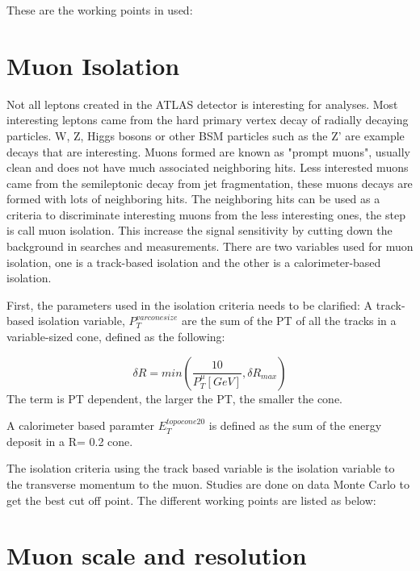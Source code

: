 These are the working points in used: 



\section{Muon Isolation}
Not all leptons created in the ATLAS detector is interesting for analyses. Most interesting leptons came from the hard primary vertex decay of radially decaying particles. W, Z, Higgs bosons or other BSM particles such as the Z' are example decays that are interesting. Muons formed are known as "prompt muons", usually clean and does not have much associated neighboring hits. Less interested muons came from the semileptonic decay from jet fragmentation, these muons decays are formed with lots of
neighboring hits. The neighboring hits can be used as a criteria to discriminate interesting muons from the less interesting ones, the step is call muon isolation. This increase the signal sensitivity by cutting down the background in searches and measurements.
There are two variables used for muon isolation, one is a track-based isolation and the other is a calorimeter-based isolation. 

First, the parameters used in the isolation criteria needs to be clarified: 
A track-based isolation variable, $P_{T}^{varcone size}$ are the sum of the PT of all the tracks in a variable-sized cone, defined as the following:

\[ \delta R = min(\frac{10}{P^{\mu}_{T}[GeV]}, \delta R_{max}) \]
The term is PT dependent, the larger the PT, the smaller the cone. 

A calorimeter based paramter $E^{topocone20}_T$ is defined as the sum of the energy deposit in a \delta R= 0.2 cone. 

The isolation criteria using the track based variable is the isolation variable to the transverse momentum to the muon. Studies are done on data Monte Carlo to get the best cut off point. The different working points are listed as below: 


\section{Muon scale and resolution}


